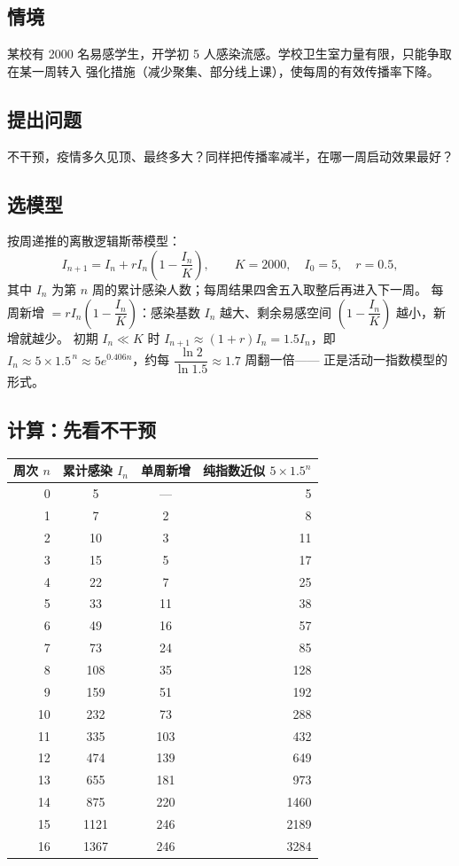 \subsection{情境}
某校有 2000 名易感学生，开学初 5 人感染流感。学校卫生室力量有限，只能争取在某一周转入
强化措施（减少聚集、部分线上课），使每周的有效传播率下降。

\subsection{提出问题}
不干预，疫情多久见顶、最终多大？同样把传播率减半，在哪一周启动效果最好？

\subsection{选模型}
按周递推的离散逻辑斯蒂模型：
\[
  I_{n+1}=I_n+rI_n\left(1-\frac{I_n}{K}\right),\qquad K=2000,\quad I_0=5,\quad r=0.5,
\]
其中 $I_n$ 为第 $n$ 周的累计感染人数；每周结果四舍五入取整后再进入下一周。
每周新增 $=rI_n\left(1-\dfrac{I_n}{K}\right)$：感染基数 $I_n$ 越大、剩余易感空间
$\left(1-\dfrac{I_n}{K}\right)$ 越小，新增就越少。
初期 $I_n\ll K$ 时 $I_{n+1}\approx(1+r)I_n=1.5I_n$，即
$I_n\approx5\times1.5^{\,n}\approx5e^{0.406n}$，约每 $\dfrac{\ln2}{\ln1.5}\approx1.7$ 周翻一倍——
正是活动一指数模型的形式。

\subsection{计算：先看不干预}
\begin{center}
\footnotesize
\setlength{\tabcolsep}{4pt}
\renewcommand{\arraystretch}{1.25}
\begin{tabular}{rccr}
\toprule
周次 $n$ & 累计感染 $I_n$ & 单周新增 & 纯指数近似 $5\times1.5^{n}$ \\
\midrule
0 & 5 & --- & 5 \\
1 & 7 & 2 & 8 \\
2 & 10 & 3 & 11 \\
3 & 15 & 5 & 17 \\
4 & 22 & 7 & 25 \\
5 & 33 & 11 & 38 \\
6 & 49 & 16 & 57 \\
7 & 73 & 24 & 85 \\
8 & 108 & 35 & 128 \\
9 & 159 & 51 & 192 \\
10 & 232 & 73 & 288 \\
11 & 335 & 103 & 432 \\
12 & 474 & 139 & 649 \\
13 & 655 & 181 & 973 \\
14 & 875 & 220 & 1460 \\
15 & 1121 & 246 & 2189 \\
16 & 1367 & 246 & 3284 \\
\bottomrule
\end{tabular}
\end{center}

